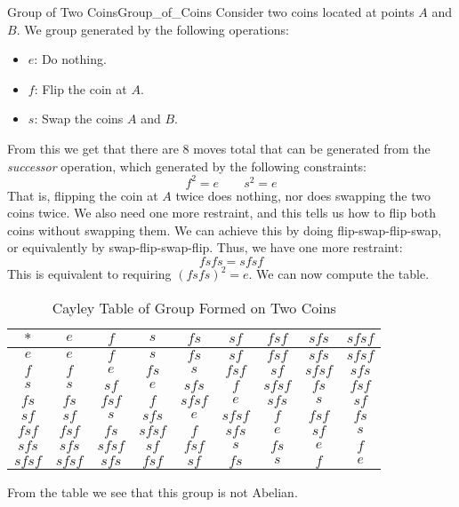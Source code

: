     \begin{lexample}{Group of Two Coins}{Group_of_Coins}
        Consider two coins located at points $A$ and $B$. We group generated by
        the following operations:
        \begin{itemize}
            \item $e$: Do nothing.
            \item $f$: Flip the coin at $A$.
            \item $s$: Swap the coins $A$ and $B$.
        \end{itemize}
        From this we get that there are 8 moves total that can be generated from
        the \textit{successor} operation, which generated by the following
        constraints:
        \begin{equation}
            f^{2}=e
            \quad\quad
            s^{2}=e
        \end{equation}
        That is, flipping the coin at $A$ twice does nothing, nor does swapping
        the two coins twice. We also need one more restraint, and this tells us
        how to flip both coins without swapping them. We can achieve this by
        doing flip-swap-flip-swap, or equivalently by swap-flip-swap-flip. Thus,
        we have one more restraint:
        \begin{equation}
            fsfs=sfsf
        \end{equation}
        This is equivalent to requiring $(fsfs)^{2}=e$. We can now compute the
        table.
        \begin{table}[H]
            \centering
            \captionsetup{type=table}
            \begin{tabular}{c|cccccccc}
                $*$&$e$&$f$&$s$&$fs$&$sf$&$fsf$&$sfs$&$sfsf$\\
                \hline
                $e$&$e$&$f$&$s$&$fs$&$sf$&$fsf$&$sfs$&$sfsf$\\
                $f$&$f$&$e$&$fs$&$s$&$fsf$&$sf$&$sfsf$&$sfs$\\
                $s$&$s$&$sf$&$e$&$sfs$&$f$&$sfsf$&$fs$&$fsf$\\
                $fs$&$fs$&$fsf$&$f$&$sfsf$&$e$&$sfs$&$s$&$sf$\\
                $sf$&$sf$&$s$&$sfs$&$e$&$sfsf$&$f$&$fsf$&$fs$\\
                $fsf$&$fsf$&$fs$&$sfsf$&$f$&$sfs$&$e$&$sf$&$s$\\
                $sfs$&$sfs$&$sfsf$&$sf$&$fsf$&$s$&$fs$&$e$&$f$\\
                $sfsf$&$sfsf$&$sfs$&$fsf$&$sf$&$fs$&$s$&$f$&$e$
            \end{tabular}
            \caption{Cayley Table of Group Formed on Two Coins}
            \label{tab:Group_Formed_on_Two_Coins}
        \end{table}
        From the table we see that this group is not Abelian.
    \end{lexample}
